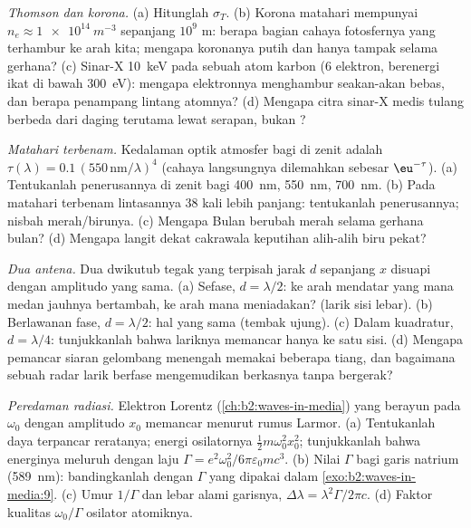 \begin{exercise}[$\star\star$]\label{exo:b2:dipole-radiation:7}
\emph{Thomson dan korona.} (a) Hitunglah $\sigma_T$. (b) Korona matahari
mempunyai $n_e \approx \qty{1e14}{m^{-3}}$ sepanjang $10^9$ m: berapa bagian cahaya
fotosfernya yang terhambur ke arah kita; mengapa koronanya putih dan hanya tampak
selama gerhana? (c) Sinar-X \qty{10}{keV} pada sebuah atom karbon ($6$
elektron, berenergi ikat di bawah \qty{300}{eV}): mengapa elektronnya
menghambur seakan-akan bebas, dan berapa penampang lintang atomnya? (d) Mengapa
citra sinar-X medis tulang berbeda dari daging terutama lewat
serapan, bukan ?
\end{exercise}

\begin{exercise}[$\star\star$]\label{exo:b2:dipole-radiation:8}
\emph{Matahari terbenam.} Kedalaman optik atmosfer bagi  di zenit adalah $\tau(\lambda) = 0.1\,(550\,\text{nm}/\lambda)^4$ (cahaya
langsungnya dilemahkan sebesar $\eu^{-\tau}$). (a) Tentukanlah penerusannya di
zenit bagi \qty{400}{nm}, \qty{550}{nm}, \qty{700}{nm}. (b) Pada matahari terbenam lintasannya
$38$ kali lebih panjang: tentukanlah penerusannya; nisbah merah/birunya. (c) Mengapa
Bulan berubah merah selama gerhana bulan? (d) Mengapa langit dekat
cakrawala keputihan alih-alih biru pekat?
\end{exercise}

\begin{exercise}[$\star\star$]\label{exo:b2:dipole-radiation:9}
\emph{Dua antena.} Dua dwikutub tegak yang terpisah jarak $d$ sepanjang
$x$ disuapi dengan amplitudo yang sama. (a) Sefase, $d = \lambda/2$: ke arah
mendatar yang mana medan jauhnya bertambah, ke arah mana meniadakan?
(larik sisi lebar). (b) Berlawanan fase, $d = \lambda/2$: hal yang sama (tembak ujung).
(c) Dalam kuadratur, $d = \lambda/4$: tunjukkanlah bahwa lariknya memancar hanya ke satu
sisi. (d) Mengapa pemancar siaran gelombang menengah memakai beberapa tiang, dan
bagaimana sebuah radar larik berfase mengemudikan berkasnya tanpa bergerak?
\end{exercise}

\begin{exercise}[$\star\star\star$]\label{exo:b2:dipole-radiation:10}
\emph{Peredaman radiasi.} Elektron Lorentz (\cref{ch:b2:waves-in-media})
yang berayun pada $\omega_0$ dengan amplitudo $x_0$ memancar menurut rumus Larmor.
(a) Tentukanlah daya terpancar reratanya; energi osilatornya $\tfrac12m\omega_0^2x_0^2$;
tunjukkanlah bahwa energinya meluruh dengan laju $\Gamma = e^2\omega_0^2/6\pi\varepsilon_0mc^3$.
(b) Nilai $\Gamma$ bagi garis natrium (\qty{589}{nm}): bandingkanlah dengan
$\Gamma$ yang dipakai dalam \cref{exo:b2:waves-in-media:9}. (c) Umur $1/\Gamma$ dan
lebar alami garisnya, $\Delta\lambda = \lambda^2\Gamma/2\pi c$. (d) Faktor kualitas
$\omega_0/\Gamma$ osilator atomiknya.
\end{exercise}

